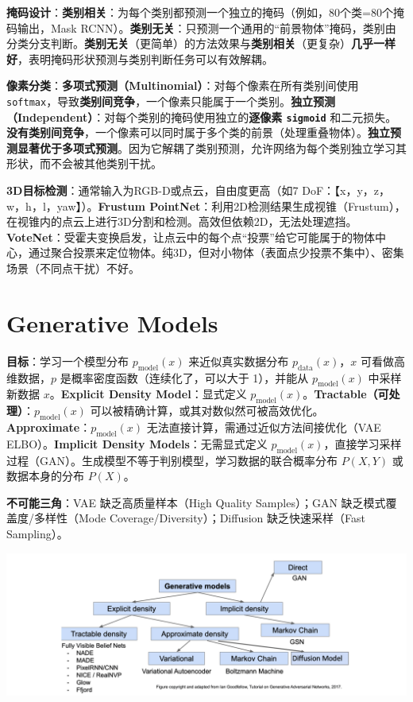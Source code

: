 \documentclass[
  8pt]{extarticle}
\begin{document}
\begin{multicols*}{4}
\textbf{掩码设计}：\textbf{类别相关}：为每个类别都预测一个独立的掩码（例如，80个类=80个掩码输出，Mask
RCNN）。\textbf{类别无关}：只预测一个通用的``前景物体''掩码，类别由分类分支判断。\textbf{类别无关}（更简单）的方法效果与\textbf{类别相关}（更复杂）\textbf{几乎一样好}，表明掩码形状预测与类别判断任务可以有效解耦。

\textbf{像素分类}：\textbf{多项式预测（Multinomial）}：对每个像素在所有类别间使用
\texttt{softmax}，导致\textbf{类别间竞争}，一个像素只能属于一个类别。\textbf{独立预测（Independent）}：对每个类别的掩码使用独立的\textbf{逐像素
\texttt{sigmoid}}
和二元损失。\textbf{没有类别间竞争}，一个像素可以同时属于多个类的前景（处理重叠物体）。\textbf{独立预测显著优于多项式预测}。因为它解耦了类别预测，允许网络为每个类别独立学习其形状，而不会被其他类别干扰。

\textbf{3D目标检测}：通常输入为RGB-D或点云，自由度更高（如7
DoF：【x，y，z，w，h，l，yaw】）。\textbf{Frustum
PointNet}：利用2D检测结果生成视锥（Frustum），在视锥内的点云上进行3D分割和检测。高效但依赖2D，无法处理遮挡。\textbf{VoteNet}：受霍夫变换启发，让点云中的每个点``投票''给它可能属于的物体中心，通过聚合投票来定位物体。纯3D，但对小物体（表面点少投票不集中）、密集场景（不同点干扰）不好。

\hypertarget{generative-models}{%
\section{Generative Models}\label{generative-models}}

\textbf{目标}：学习一个模型分布 \(p_{\text{model}}(x)\)
来近似真实数据分布 \(p_{\text{data}}(x)\)，\(x\) 可看做高维数据，\(p\)
是概率密度函数（连续化了，可以大于 1），并能从 \(p_{\text{model}}(x)\)
中采样新数据 \(x\)。\textbf{Explicit Density Model}：显式定义
\(p_{\text{model}}(x)\)。\textbf{Tractable（可处理）}：\(p_{\text{model}}(x)\)
可以被精确计算，或其对数似然可被高效优化。\textbf{Approximate}：\(p_{\text{model}}(x)\)
无法直接计算，需通过近似方法间接优化（VAE ELBO）。\textbf{Implicit
Density Models}：无需显式定义
\(p_{\text{model}}(x)\)，直接学习采样过程（GAN）。生成模型不等于判别模型，学习数据的联合概率分布
\(P(X, Y)\) 或数据本身的分布 \(P(X)\)。

\textbf{不可能三角}：VAE 缺乏高质量样本（High Quality Samples）；GAN
缺乏模式覆盖度/多样性（Mode Coverage/Diversity）；Diffusion
缺乏快速采样（Fast Sampling）。

\includegraphics{./Cheatsheet-04-Generative-Model.assets/image-20250618013556902.png}


\end{multicols*}
\end{document}
